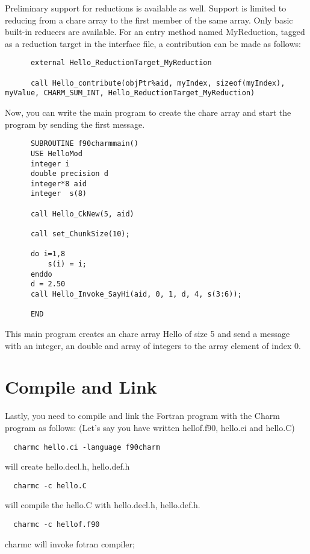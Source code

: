 \documentclass[11pt]{article}
\begin{document}
Preliminary support for reductions is available as well. Support is limited to
reducing from a chare array to the first member of the same array. Only basic
built-in reducers are available. For an entry method named MyReduction, tagged
as a reduction target in the interface file, a contribution can be made as
follows:

\begin{verbatim}
      external Hello_ReductionTarget_MyReduction

      call Hello_contribute(objPtr%aid, myIndex, sizeof(myIndex), myValue, CHARM_SUM_INT, Hello_ReductionTarget_MyReduction)
\end{verbatim}

Now, you can write the main program to create the chare array and start the 
program by sending the first message.
\begin{verbatim}
      SUBROUTINE f90charmmain()
      USE HelloMod
      integer i
      double precision d
      integer*8 aid
      integer  s(8)

      call Hello_CkNew(5, aid)

      call set_ChunkSize(10);

      do i=1,8
          s(i) = i;
      enddo
      d = 2.50
      call Hello_Invoke_SayHi(aid, 0, 1, d, 4, s(3:6));

      END
\end{verbatim}
This main program creates an chare array Hello of size 5 and send a message with
an integer, an double and array of integers to the array element of index 0.

\section{Compile and Link}
Lastly, you need to compile and link the Fortran program with the
Charm program as follows: (Let's say you have written hellof.f90, 
hello.ci and hello.C)
\begin{verbatim}
  charmc hello.ci -language f90charm
\end{verbatim}
    will create hello.decl.h, hello.def.h

\begin{verbatim}
  charmc -c hello.C
\end{verbatim}
    will compile the hello.C with hello.decl.h, hello.def.h.

\begin{verbatim}
  charmc -c hellof.f90
\end{verbatim}
    charmc will invoke fotran compiler;
\end{document}
